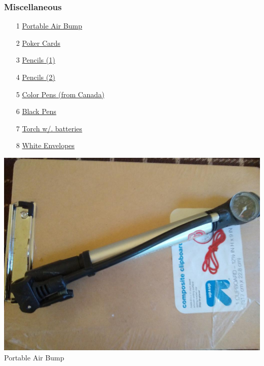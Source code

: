 \documentclass[t]{beamer}
\newcommand{\hlink}[2]{\hyperlink{#1}{#2}}
\newcommand{\htarget}[2]{\hypertarget{#1}{#2}}
\begin{document}
\begin{frame}[allowframebreaks]
\frametitle{Miscellaneous}
\begin{enumerate}
\item[1] \hlink{air}{Portable Air Bump}
\item[2] \hlink{poker}{Poker Cards}
\item[3] \hlink{pencil1}{Pencils (1)}
\item[4] \hlink{pencil2}{Pencils (2)}
\item[5] \hlink{colorpens}{Color Pens (from Canada)}
\item[6] \hlink{blackpens}{Black Pens}
\item[7] \hlink{torch}{Torch w/. batteries}
\item[8] \hlink{envelopes}{White Envelopes}
\end{enumerate}
\end{frame}
\begin{frame}\htarget{air}{} \begin{center}
\includegraphics[height=0.8\textheight]{portable_air_bump_mini.jpg} \\
Portable Air Bump
\end{center} \end{frame}
\end{document}
